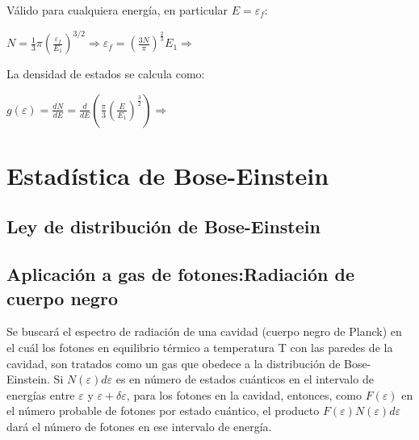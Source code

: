 \documentclass[oneside]{book}
\numberwithin{equation}{section}
\numberwithin{figure}{section}
\numberwithin{table}{section}
\begin{document}
\begin{itemize}
						Válido para cualquiera energía, en particular $E=\varepsilon_f$:						
						
						\begin{center}
							$\displaystyle N=\frac{1}{3}\pi \left( \frac{\varepsilon_f}{E_1}\right)^{3/2} \Rightarrow \varepsilon_f=\left( \frac{3N}{\pi} \right)^{\frac{2}{3}} E_1 \Rightarrow$ 
						\end{center}
			
						La densidad de estados se calcula como:
						
						\begin{center}
							$\displaystyle g(\varepsilon)=\frac{dN}{dE}=\frac{d}{dE}\left(\frac{\pi}{3}\left(\frac{E}{E_1}\right)^{\frac{3}{2}}\right) \Rightarrow$ 
						\end{center}

			\end{itemize}					
			
		\section{Estadística de Bose-Einstein}
		
			\subsection{Ley de distribución de Bose-Einstein}	
			
				\begin{center}
				\end{center}
						
			\subsection{Aplicación a gas de fotones:Radiación de cuerpo negro}
			
				Se buscará el espectro de radiación de una cavidad (cuerpo negro de Planck) en el cuál los fotones en equilibrio térmico a temperatura T con las paredes de la cavidad, son tratados como un gas que obedece a la distribución de Bose-Einstein. Si $N(\varepsilon)d\varepsilon$ es en número de estados cuánticos en el intervalo de energías entre $\varepsilon$ y $\varepsilon+\delta \varepsilon$, para los fotones en la cavidad, entonces, como $F(\varepsilon)$ en el número probable de fotones por estado cuántico, el producto $F(\varepsilon)N(\varepsilon)d\varepsilon$ dará el número de fotones en ese intervalo de energía.\\
				
\end{document}
